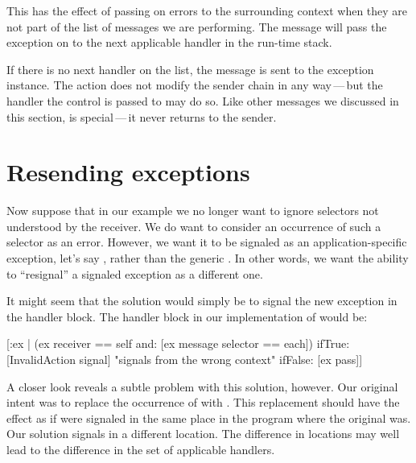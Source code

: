 \documentclass[a4paper,10pt,twoside]{book}
\begin{document}
This has the effect of passing on  errors to the surrounding context when they are not part of the list of messages we are performing. The  message will pass the exception on to the next applicable handler in the run-time stack.

If there is no next handler on the list, the  message is sent to the exception instance. The  action does not modify the sender chain in any way\,---\,but the handler the control is passed to may do so. Like other messages we discussed in this section,  is special\,---\,it never returns to the sender.


\section{Resending exceptions}

Now suppose that in our  example we no longer want to ignore selectors not understood by the receiver. We do want to consider an occurrence of such a selector as an error. However, we want it to be signaled as an application-specific exception, let's say , rather than the generic . In other words, we want the ability to ``resignal'' a signaled exception as a different one.

It might seem that the solution would simply be to signal the new exception in the handler block. The handler block in our implementation of  would be:

\begin{code}{}
[:ex | (ex receiver == self and: [ex message selector == each])
	ifTrue: [InvalidAction signal]    "signals from the wrong context"
	ifFalse: [ex pass]]
\end{code}

A closer look reveals a subtle problem with this solution, however. Our original intent was to replace the occurrence of  with . This replacement should have the effect as if  were signaled in the same place in the program where the original  was. Our solution signals  in a different location. The difference in locations may well lead to the difference in the set of applicable handlers.
\end{document}
